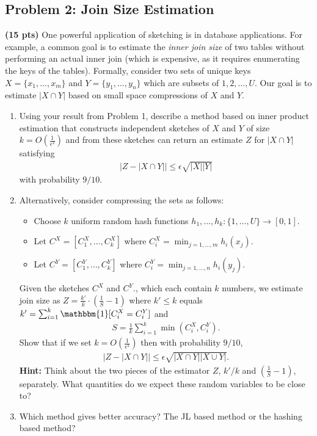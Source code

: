 \documentclass[10pt]{article}
\begin{document}
\subsection{Problem 2: Join Size Estimation}
\noindent\textbf{(15 pts)}
One powerful application of sketching is in database applications. For example, a common goal is to estimate the \emph{inner join size} of two tables without performing an actual inner join (which is expensive, as it requires enumerating the keys of the tables). Formally, consider two sets of unique keys $X = \{x_1, \ldots, x_m\}$ and $Y = \{y_1, \ldots, y_n\}$ which are subsets of $1,2, \ldots, U$.  Our goal is to estimate $|X\cap Y|$ based on small space compressions of $X$ and $Y$.  
\begin{enumerate}
\item Using your result from Problem 1, describe a method based on inner product estimation that constructs independent sketches of $X$ and $Y$ of size  $k = O\left(\frac{1}{\epsilon^2}\right)$ and from these sketches can return an estimate $Z$ for $|X\cap Y|$ satisfying
\begin{align*}
	\left|Z - |X\cap Y|\right| \leq \epsilon \sqrt{|X||Y|}
\end{align*}
with probability $9/10$.

\item Alternatively, consider compressing the sets as follows:
\begin{itemize}
	\item Choose $k$ uniform random hash functions $h_1, \ldots, h_k: \{1, \ldots, U\}\rightarrow [0,1]$. 
	\item Let $C^X = [C^X_1,  \ldots, C^X_k]$ where $C_i^X = \min_{j = 1, \ldots, m} h_i(x_j)$.
	\item Let $C^Y = [C^Y_1,  \ldots, C^Y_k]$ where $C_i^Y= \min_{j = 1, \ldots, n} h_i(y_j)$.
\end{itemize}
Given the sketches $C^X$ and $C^Y$., which each contain $k$ numbers, we estimate join size as $Z = \frac{k'}{k} \cdot (\frac{1}{S} - 1)$ where $k' \leq k$ equals $k' = \sum_{i=1}^k \mathbbm{1}[C^X_i = C^Y_i]$ and 
\begin{align*}
	S = \frac{1}{k}\sum_{i=1}^k \min(C^X_i,C^Y_i).
\end{align*}
Show that if we set $k = O(\frac{1}{\epsilon^2})$ then with probability $9/10$,
\begin{align*}
	\left|Z - |X\cap Y|\right| \leq \epsilon \sqrt{|X\cap Y||X\cup Y|}.
\end{align*}
\textbf{Hint:} Think about the two pieces of the estimator $Z$, $k'/k$ and $(\frac{1}{S} - 1)$, separately. What quantities do we expect these random variables to be close to? 
\item Which method gives better accuracy? The JL based method or the hashing based method?
\end{enumerate}
\end{document}
